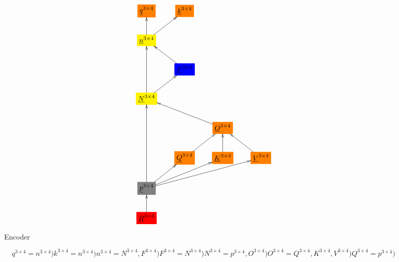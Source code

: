 \documentclass[12pt]{article}
\begin{document}
\begin{figure}[h!]\centering
$$\xymatrix{
*+[F*:orange]{\underline{q}^{3\times  4}}&*+[F*:orange]{\underline{k}^{3\times  4}}&&
\\
*+[F*:yellow]{\underline{n}^{3\times  4}}\ar[u]\ar[ur]&&&
\\
&*+[F*:blue]{\underline{F}^{3\times  4}}\ar[ul]&&
\\
*+[F*:yellow]{\underline{N}^{3\times  4}}\ar[uu]\ar[ur]&&&
\\
&&*+[F*:orange]{\underline{O}^{3\times  4}}\ar[ull]&
\\
&*+[F*:orange]{\underline{Q}^{3\times  4}}\ar[ur]&*+[F*:orange]{\underline{K}^{3\times  4}}\ar[u]&*+[F*:orange]{\underline{V}^{3\times  4}}\ar[ul]
\\
*+[F*:gray]{\underline{p}^{3\times  4}}\ar[uuu]\ar[ur]\ar[urr]\ar[urrr]&&&
\\
*+[F*:red]{\underline{R}^{3\times  4}}\ar[u]&&&
}$$
\caption{Encoder}
\label{fig-texnn-for-encoder}
\end{figure}\begin{subequations}
\begin{equation}
q^{3\times  4} = n^{3\times  4})
\label{eq-q-fun-encoder}
\end{equation}

\begin{equation}
k^{3\times  4} = n^{3\times  4})
\label{eq-k-fun-encoder}
\end{equation}

\begin{equation}
n^{3\times  4} = N^{3\times  4},F^{3\times  4})
\label{eq-n-fun-encoder}
\end{equation}

\begin{equation}
F^{3\times  4} = N^{3\times  4})
\label{eq-F-fun-encoder}
\end{equation}

\begin{equation}
N^{3\times  4} = p^{3\times  4},O^{3\times  4})
\label{eq-N-fun-encoder}
\end{equation}

\begin{equation}
O^{3\times  4} = Q^{3\times  4},K^{3\times  4},V^{3\times  4})
\label{eq-O-fun-encoder}
\end{equation}

\begin{equation}
Q^{3\times  4} = p^{3\times  4})
\label{eq-Q-fun-encoder}
\end{equation}


\end{subequations}
\end{document}
